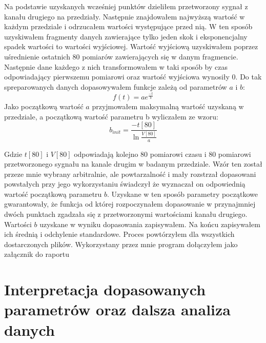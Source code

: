 \documentclass[10pt,a4paper]{article}
\begin{document}
Na podstawie uzyskanych wcześniej punktów dzieliłem przetworzony sygnał z kanału drugiego na przedziały. Następnie znajdowałem najwyższą wartość w każdym przedziale i odrzucałem wartości występujące przed nią.  W ten sposób uzyskiwałem fragmenty danych zawierające tylko jeden skok  i eksponencjalny spadek wartości  to wartości wyjściowej. Wartość wyjściową uzyskiwałem poprzez uśrednienie ostatnich 80 pomiarów zawierających się w danym fragmencie.  Następnie dane każdego z nich transformowałem w taki sposób by  czas odpowiadający pierwszemu pomiarowi oraz wartość wyjściowa wynosiły 0. Do tak spreparowanych danych dopasowywałem funkcje zależą od parametrów $a$ i $b$: 
\begin{equation}
    \label{exp}
    f(t) = a e^{\frac{-t}{b}}
\end{equation}
Jako początkową wartość $a$ przyjmowałem maksymalną wartość uzyskaną w przedziale, a początkową wartość parametru b wyliczałem ze wzoru:
\begin{equation}
    \label{binit}
    b_{init} = \frac{-t[80]}{\ln{\frac{V[80]}{a}}}
\end{equation}

Gdzie $t[80]$ i $V[80]$ odpowiadają kolejno 80 pomiarowi czasu i 80 pomiarowi przetworzonego sygnału na kanale drugim w badanym przedziale.  Wzór ten został przeze mnie wybrany arbitralnie, ale powtarzalność i mały rozstrzał dopasowani powstałych przy jego wykorzystaniu świadczył że wyznaczał on odpowiednią wartość początkową parametru $b$. Uzyskane w ten sposób parametry początkowe gwarantowały, że funkcja od której rozpoczynałem dopasowanie w przynajmniej dwóch punktach zgadzała się z przetworzonymi wartościami kanału drugiego.
Wartości $b$ uzyskane w wyniku dopasowania zapisywałem. Na końcu zapisywałem ich średnią i odchylenie standardowe. Proces powtórzyłem dla wszystkich dostarczonych plików.
Wykorzystany przez mnie program dołączyłem jako załącznik do raportu

\section{Interpretacja dopasowanych parametrów oraz dalsza analiza danych}
\end{document}
